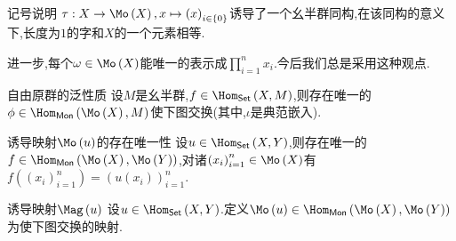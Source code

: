 \begin{remark}{记号说明}{}
	$\tau:X\to\Mo\left(X\right),x\mapsto\left(x\right)_{i\in\left\{0\right\}}$诱导了一个幺半群同构,在该同构的意义下,长度为$1$的字和$X$的一个元素相等.
	
	进一步,每个$\omega\in\Mo\left(X\right)$能唯一的表示成$\prod\limits_{i=1}^{n}x_{i}$.今后我们总是采用这种观点.
\end{remark}

\begin{proposition}{自由原群的泛性质}{}
	设$M$是幺半群,$f\in\Hom_{\mathsf{Set}}\left(X,M\right)$,则存在唯一的$\phi\in\Hom_{\mathsf{Mon}}\left(\Mo\left(X\right),M\right)$使下图交换(其中,$\iota$是典范嵌入).
	\begin{center}
	\end{center}
\end{proposition}

\begin{proposition}{诱导映射$\Mo\left(u\right)$的存在唯一性}{}
	设$u\in\Hom_{\mathsf{Set}}\left(X,Y\right)$,则存在唯一的$f\in\Hom_{\mathsf{Mon}}\left(\Mo\left(X\right),\Mo\left(Y\right)\right)$,对诸$\left(x_{i}\right)_{i=1}^{n}\in\Mo\left(X\right)$有$f\left(\left(x_{i}\right)_{i=1}^{n}\right)=\left(u\left(x_{i}\right)\right)_{i=1}^{n}$.
\end{proposition}

\begin{definition}{诱导映射$\Mag\left(u\right)$}{}
	设$u\in\Hom_{\mathsf{Set}}\left(X,Y\right)$.定义$\Mo\left(u\right)\in\Hom_{\mathsf{Mon}}\left(\Mo\left(X\right),\Mo\left(Y\right)\right)$为使下图交换的映射.
	\begin{center}
	\end{center}
\end{definition}

